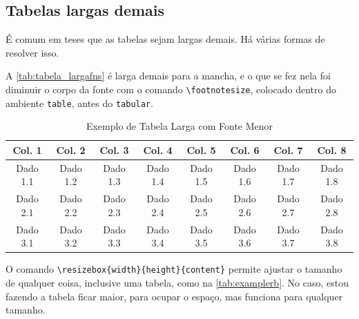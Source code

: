 \documentclass[dsc,setavermelha]{ufrj}
\theoremstyle{plain}
\theoremstyle{definition}
\theoremstyle{remark}
\begin{document}
\subsection{Tabelas largas demais}

É comum em teses que as tabelas sejam largas demais. Há várias formas de resolver isso.

A \autoref{tab:tabela_largafns} é larga demais para a mancha, e o que se fez nela foi diminuir o corpo da fonte com o comando \verb|\footnotesize|, colocado dentro do ambiente \verb|table|, antes do \verb|tabular|.

\begin{table}[ht]
\centering %
\caption{Exemplo de Tabela Larga com Fonte Menor}
\label{tab:tabela_largafns}
\footnotesize %
\begin{tabular}{cccccccc} %
\toprule
\textbf{Col. 1} & \textbf{Col. 2} & \textbf{Col. 3} & \textbf{Col. 4} & \textbf{Col. 5} & \textbf{Col. 6} & \textbf{Col. 7} & \textbf{Col. 8} \\
\midrule
Dado 1.1 & Dado 1.2 & Dado 1.3 & Dado 1.4 & Dado 1.5 & Dado 1.6 & Dado 1.7 & Dado 1.8 \\
Dado 2.1 & Dado 2.2 & Dado 2.3 & Dado 2.4 & Dado 2.5 & Dado 2.6 & Dado 2.7 & Dado 2.8 \\
Dado 3.1 & Dado 3.2 & Dado 3.3 & Dado 3.4 & Dado 3.5 & Dado 3.6 & Dado 3.7 & Dado 3.8 \\
\bottomrule
\end{tabular}
\end{table}

O comando \verb|\resizebox{width}{height}{content}| permite ajustar o tamanho de qualquer coisa, inclusive uma tabela, como na \autoref{tab:examplerb}. No caso, estou fazendo a tabela ficar maior, para ocupar o espaço, mas funciona para qualquer tamanho.

\begin{table}[ht]
\centering
\caption{Exemplo de Tabela Redimensionada}
\label{tab:examplerb}
\end{table}
\end{document}
